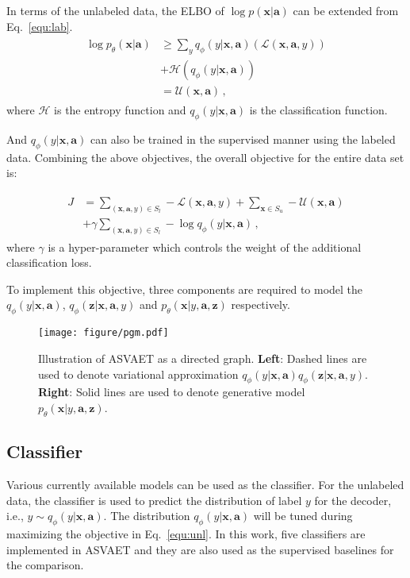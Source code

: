 \documentclass[11pt,a4paper]{article}
\begin{document}
In terms of the unlabeled data, the ELBO of $\log p(\mathbf{x}|\mathbf{a})$ can be extended from Eq.~\ref{equ:lab}.
\begin{eqnarray}
\begin{split}
\log p_{\theta}(\mathbf{x}|\mathbf{a}) & \ge \sum_{y}q_{\phi}(y|\mathbf{x}, \mathbf{a})(\mathcal{L}(\mathbf{x}, \mathbf{a}, y)) \\ 
& + \mathcal{H}(q_{\phi}(y|\mathbf{x}, \mathbf{a})) \\
& = \mathcal{U}(\mathbf{x}, \mathbf{a})\,,
\end{split}
\label{equ:unl}
\end{eqnarray}
where $\mathcal{H}$ is the entropy function and $q_{\phi}(y|\mathbf{x}, \mathbf{a})$ is the classification function.

And $q_{\phi}(y|\mathbf{x}, \mathbf{a})$ can also be trained in the supervised manner using the labeled data.
Combining the above objectives, the overall objective for the entire data set is:

\begin{eqnarray}
\begin{split}
J & = \sum_{(\mathbf{x}, \mathbf{a}, y) \in S_{l}}-\mathcal{L}(\mathbf{x}, \mathbf{a}, y) + \sum_{\mathbf{x} \in S_{u}}-\mathcal{U}(\mathbf{x}, \mathbf{a}) \\
& + \gamma \sum_{(\mathbf{x}, \mathbf{a}, y) \in S_{l}}-\log q_{\phi}(y|\mathbf{x}, \mathbf{a}) \,,
\end{split}
\label{equ:com}
\end{eqnarray}
where  $\gamma$ is a hyper-parameter which controls the weight of the additional classification loss. 

To implement this objective, three components are required to model the $q_{\phi}(y|\mathbf{x}, \mathbf{a})$, $q_{\phi}(\mathbf{z}|\mathbf{x},\mathbf{a},y)$ and $p_{\theta}(\mathbf{x}|y, \mathbf{a}, \mathbf{z})$ respectively.


\begin{figure}
	\centering
	\texttt{[image: figure/pgm.pdf]}
	\caption{Illustration of ASVAET as a directed graph. \textbf{Left}: Dashed lines are used to denote variational approximation $q_\phi(y|\mathbf{x},\mathbf{a})q_\phi(\mathbf{z}|\mathbf{x},\mathbf{a}, y)$. \textbf{Right}: Solid lines are used to denote generative model $p_\theta(\mathbf{x}|y,\mathbf{a},\mathbf{z})$.}\label{fig:vi}
\end{figure}


\subsection{Classifier}
Various currently available models can be used as the classifier. For the unlabeled data, the classifier is used to predict the distribution of label $y$ for the decoder, i.e., $y \sim q_{\phi}(y|\mathbf{x}, \mathbf{a})$.
The distribution $q_{\phi}(y|\mathbf{x}, \mathbf{a})$ will be tuned during maximizing the objective in Eq.~\ref{equ:unl}.
In this work, five classifiers are implemented in ASVAET and they are also used as the supervised baselines for the comparison.
\end{document}
